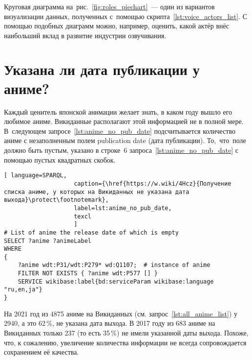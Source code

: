 Круговая диаграмма 
на~рис.~\ref{fig:roles_piechart}~--- один из вариантов визуализации данных, 
полученных с~помощью скрипта~\ref{lst:voice_actors_list}. С помощью подобных диаграмм можно, например, оценить, какой актёр внёс наибольший вклад в развитие индустрии озвучивания.

\section{Указана ли дата публикации у аниме?}

Каждый ценитель японской анимации желает знать, 
в каком году вышло его любимое аниме. 
Викиданные располагают этой информацией не в полной мере. 
В~следующем запросе~\ref{lst:anime_no_pub_date} подсчитывается количество аниме с незаполненным полем publication date (дата публикации). 
То,~что~поле должно быть пустым, указано в строке~6 запроса~\ref{lst:anime_no_pub_date} с помощью пустых квадратных скобок.



\newpage
%
%
\lstset{numbers=left, firstnumber=1, frame=single}
\begin{lstlisting}[ language=SPARQL, 
                    caption={\href{https://w.wiki/4Hcz}{Получение списка аниме, у которых на Викиданных не указана дата выхода}\protect\footnotemark},
                    label=lst:anime_no_pub_date,
                    texcl 
                    ]
# List of anime the release date of which is empty
SELECT ?anime ?animeLabel
WHERE
{
    ?anime wdt:P31/wdt:P279* wd:Q1107;  # instance of anime
    FILTER NOT EXISTS { ?anime wdt:P577 [] }
    SERVICE wikibase:label{bd:serviceParam wikibase:language "ru,en,ja"}
}
\end{lstlisting}%
\lstset{numbers=none}

На 2021 год из \num{4875} аниме на Викиданных (см. запрос~\ref{lst:all_anime_list}) 
у \num{2940}, а это 62\,\%, не указана дата выхода. 
В 2017 году из 683 аниме на Викиданных только 237 (то есть 35\,\%) не имели указанной даты выхода. 
Похоже, что, к сожалению, увеличение количества информации 
не всегда сопровождается сохранением её качества.%





